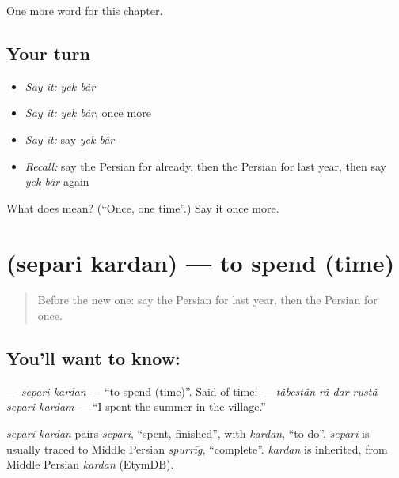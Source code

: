 \begin{grammarlens}[title={What you've built}]
One more word for this chapter.
\end{grammarlens}

\subsection*{Your turn}
\begin{itemize}
\raggedright
  \item \emph{Say it:} \emph{yek bâr}
  \item \emph{Say it:} \emph{yek bâr}, once more
  \item \emph{Say it:} say \emph{yek bâr}
  \item \emph{Recall:} say the Persian for already, then the Persian for last year, then say \emph{yek bâr} again
\end{itemize}

\begin{tcolorbox}[breakable,colback=teal!4,colframe=teal!35!black,title={Before you move on}]
What does   mean? (\textquotedblleft{}Once, one time\textquotedblright{}.) Say it once more.
\end{tcolorbox}
\section[\texorpdfstring{\fa{سپری} \fa{کردن} (separi kardan)}{سپری کردن (separi kardan)}]{  (separi kardan) — to spend (time)}

\label{lesson:FA-C137-separi-kardan}



\begin{quote}
Before the new one: say the Persian for last year, then the Persian for once.
\end{quote}

\subsection*{You'll want to know:  }
\textbf{ } — \emph{separi kardan} — \textquotedblleft{}to spend (time)\textquotedblright{}. Said of time: \textbf{     } — \emph{tâbestân râ dar rustâ separi kardam} — \textquotedblleft{}I spent the summer in the village.\textquotedblright{}

\begin{cousinweb}
\emph{separi kardan} pairs \emph{separi}, \textquotedblleft{}spent, finished\textquotedblright{}, with \emph{kardan}, \textquotedblleft{}to do\textquotedblright{}. \emph{separi} is usually traced to Middle Persian \emph{spurrīg}, \textquotedblleft{}complete\textquotedblright{}. \emph{kardan} is inherited, from Middle Persian \emph{kardan} (EtymDB).
\end{cousinweb}


